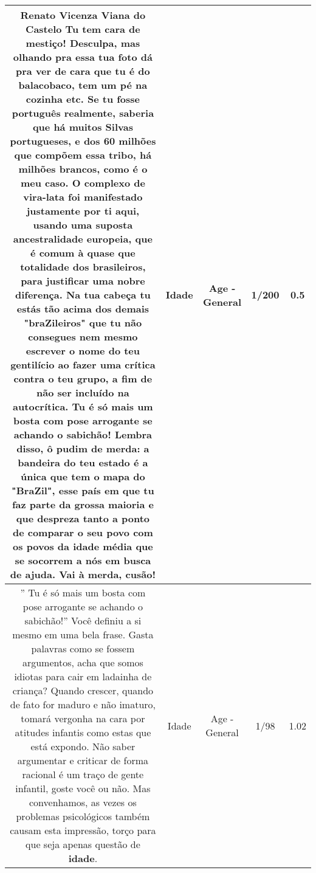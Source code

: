 \documentclass[11pt]{article}
\newlength\mylength
\begin{document}
\begin{center}
\begin{longtable}{|C{.65\mylength}|C{.30\mylength}|C{.12\mylength}|C{.12\mylength}|C{.12\mylength}|}
  \small Renato Vicenza Viana do Castelo Tu tem cara de mestiço! Desculpa, mas olhando pra essa tua foto dá pra ver de cara que tu é do balacobaco, tem um pé na cozinha etc. Se tu fosse português realmente, saberia que há muitos Silvas portugueses, e dos 60 milhões que compõem essa tribo, há milhões brancos, como é o meu caso. O complexo de vira-lata foi manifestado justamente por ti aqui, usando uma suposta ancestralidade europeia, que é comum à quase que totalidade dos brasileiros, para justificar uma nobre diferença. Na tua cabeça tu estás tão acima dos demais "braZileiros" que tu não consegues nem mesmo escrever o nome do teu gentilício ao fazer uma crítica contra o teu grupo, a fim de não ser incluído na autocrítica. Tu é só mais um bosta com pose arrogante se achando o sabichão! Lembra disso, ô pudim de merda: a bandeira do teu estado é a única que tem o mapa do "BraZil", esse país em que tu faz parte da grossa maioria e que despreza tanto a ponto de comparar o seu povo com os povos da \textbf{idade} média que se socorrem a nós em busca de ajuda. Vai à merda, cusão!\normalsize   & Idade & Age - General & 1/200 & 0.5 \\  \hline
  \small '' Tu é só mais um bosta com pose arrogante se achando o sabichão!'' Você definiu a si mesmo em uma bela frase. Gasta palavras como se fossem argumentos, acha que somos idiotas para cair em ladainha de criança? Quando crescer, quando de fato for maduro e não imaturo, tomará vergonha na cara por atitudes infantis como estas que está expondo. Não saber argumentar e criticar de forma racional é um traço de gente infantil, goste você ou não. Mas convenhamos, as vezes os problemas psicológicos também causam esta impressão, torço para que seja apenas questão de \textbf{idade}.\normalsize   & Idade & Age - General & 1/98 & 1.02 \\  \hline

\end{longtable}
\end{center}
\end{document}
